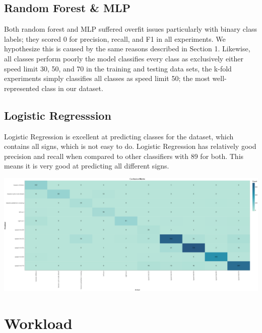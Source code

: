 \documentclass[11pt]{article}
\begin{document}
\subsection{Random Forest \& MLP}
Both random forest and MLP suffered overfit issues particularly with binary class labels; they scored 0 for precision, recall, and F1 in all experiments. We hypothesize this is caused by the same reasons described in Section 1. Likewise, all classes perform poorly the model classifies every class as exclusively either speed limit 30, 50, and 70 in the training and testing data sets, the k-fold experiments simply classifies all classes as speed limit 50; the most well-represented class in our dataset. 

\subsection{Logistic Regresssion}
Logistic Regression is excellent at predicting classes for the dataset, which contains all signs, which is not easy to do. Logistic Regression has relatively good precision and recall when compared to other classifiers with 89 for both. This means it is very good at predicting all different signs.

\begin{center}
  \includegraphics [width = \textwidth, height = 0.3\textheight, keepaspectratio]{Images/LRConfMat.png}
\end{center}

\pagebreak
\appendix
\appendixpage
\addappheadtotoc

\section{Workload}

\end{document}
